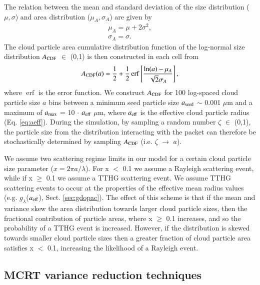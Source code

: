 \documentclass{aa}
\DeclareMathOperator\erf{erf}
\begin{document}
The relation between the mean and standard deviation of the size distribution ($\mu, \sigma$) and area distribution ($\mu_{A}, \sigma_{A}$) are given by  \citep[e.g.][]{Heintzenberg1994}
\begin{eqnarray}
\mu_{A} = \mu + 2\sigma^{2} , \nonumber \\
\sigma_{A} = \sigma.
\end{eqnarray}
The cloud particle area cumulative distribution function of the log-normal size distribution $A_{\rm CDF}$ $\in$ (0,1) is then constructed in each cell from \citep[e.g.][]{Zender2015}
\begin{equation}
A_{\rm CDF}(a) = \frac{1}{2} + \frac{1}{2}\erf\left[\frac{\ln (a) - \mu_{A}}{\sqrt{2}\sigma_{A}}\right], 
\end{equation}
where $\erf$ is the error function.
We construct $A_{\rm CDF}$ for 100 log-spaced cloud particle size $a$ bins between a minimum seed particle size $a_{\rm seed}$ $\sim$ 0.001 $\mu$m and a maximum of $a_{\rm max}$ = 10 $\cdot$ $a_{\rm eff}$ $\mu$m, where $a_{\rm eff}$ is the effective cloud particle radius (Eq. \ref{eq:aeff}).
During the simulation, by sampling a random number $\zeta$ $\in$ (0,1), the particle size from the distribution interacting with the packet can therefore be stochastically determined by sampling  $A_{\rm CDF}$ (i.e. $\zeta$ $\rightarrow$ $a$).

We assume two scattering regime limits in our model for a certain cloud particle size parameter ($x = 2\pi a /\lambda$).
For x $<$ 0.1 we assume a Rayleigh scattering event, while if x $\ge$ 0.1 we assume a TTHG scattering event.
We assume TTHG scattering events to occur at the properties of the effective mean radius values (e.g.  $g_{\lambda}$($a_{\rm eff}$), Sect. \ref{sec:gdopac}).
The effect of this scheme is that if the mean and variance skew the area distribution towards larger cloud particle sizes, then the fractional contribution of particle areas, where x $\ge$ 0.1 increases, and so the probability of a TTHG event is increased.
However, if the distribution is skewed towards smaller cloud particle sizes then a greater fraction of cloud particle area satisfies x $<$ 0.1, increasing the likelihood of a Rayleigh event.

\subsection{MCRT variance reduction techniques}
\label{sec:var_red}
\end{document}
